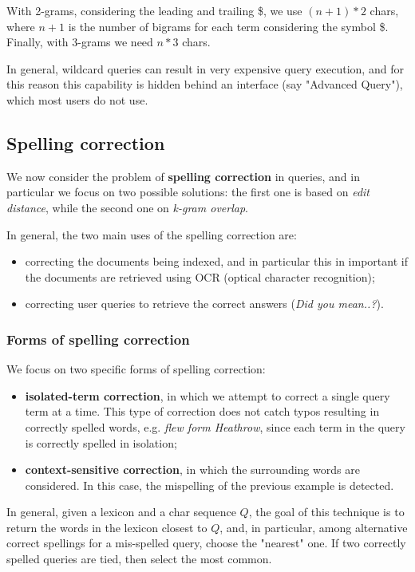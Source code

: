 With 2-grams, considering the leading and trailing \$, we use $(n+1) * 2$ chars, where $n+1$ is the number of bigrams for each term considering the symbol \$. Finally, with 3-grams we need $n*3$ chars.

In general, wildcard queries can result in very expensive query execution, and for this reason this capability is hidden behind an interface (say "Advanced Query"), which most users do not use.

\subsection{Spelling correction}\label{4.3}
We now consider the problem of \textbf{spelling correction} in queries, and in particular we focus on two possible solutions: the first one is based on \textit{edit distance}, while the second one on \textit{k-gram overlap}.

In general, the two main uses of the spelling correction are:

\begin{itemize}
    \item correcting the documents being indexed, and in particular this in important if the documents are retrieved using OCR (optical character recognition);
    \item correcting user queries to retrieve the correct answers (\textit{Did you mean..?}).
\end{itemize}

\subsubsection{Forms of spelling correction}
We focus on two specific forms of spelling correction:

\begin{itemize}
    \item \textbf{isolated-term correction}, in which we attempt to correct a single query term at a time. This type of correction does not catch typos resulting in correctly spelled words, e.g. \textit{flew form Heathrow}, since each term in the query is correctly spelled in isolation;
    \item \textbf{context-sensitive correction}, in which the surrounding words are considered. In this case, the mispelling of the previous example is detected.
\end{itemize}

In general, given a lexicon and a char sequence $Q$, the goal of this technique is to return the words in the lexicon closest to $Q$, and, in particular, among alternative correct spellings for a mis-spelled query, choose the "nearest" one. If two correctly spelled queries are tied, then select the most common.


